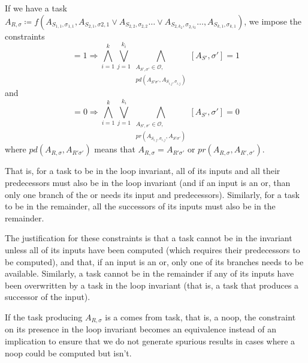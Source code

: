\documentclass[12pt,letterpaper]{article}
\newcommand*{\outputs}{\mathcal{O}}
\begin{document}
If we have a task $A_{R, \sigma} \coloneqq f(A_{S_{1, 1}, \sigma_{1, 1}}, A_{S_{2, 1}, \sigma{2, 1}} \vee A_{S_{2, 2}, \sigma_{2, 2}} \ldots \vee A_{S_{2, k_2}, \sigma_{2, i_2}} \ldots, A_{S_{k, 1}, \sigma_{k, 1}})$, we impose the constraints
\begin{equation*}
  [A_R, \sigma] = 1 \Rightarrow \bigwedge_{i = 1}^k \bigvee_{j = 1}^{k_i} \bigwedge_{\substack{A_{S', \sigma'} \in \outputs,\\
                                                    pd(A_{S' \sigma'}, A_{S_{i, j}, \sigma_{i, j}})}} [A_{S'}, \sigma'] = 1
\end{equation*}
and
\begin{equation*}
  [A_R, \sigma] = 0 \Rightarrow \bigwedge_{i = 1}^k \bigvee_{j = 1}^{k_i} \bigwedge_{\substack{A_{S', \sigma'} \in \outputs,\\
                                                    pr(A_{S_{i, j}, \sigma_{i, j}}, A_{S' \sigma'})}} [A_{S'}, \sigma'] = 0
\end{equation*}
where $pd(A_{R, \sigma}, A_{R' \sigma'})$ means that $A_{R, \sigma} = A_{R' \sigma'}$ or $pr(A_{R, \sigma}, A_{R', \sigma'})$.

That is, for a task to be in the loop invariant, all of its inputs and all their predecessors must also be in the loop invariant (and if an input is an or, than only one branch of the or needs its input and predecessors).
Similarly, for a task to be in the remainder, all the successors of its inputs must also be in the remainder.

The justification for these constraints is that a task cannot be in the invariant unless all of its inputs have been computed (which requires their predecessors to be computed), and that, if an input is an or, only one of its branches needs to be available.
Similarly, a task cannot be in the remainder if any of its inputs have been overwritten by a task in the loop invariant (that is, a task that produces a successor of the input).

If the task producing $A_{R, \sigma}$ is a comes from task, that is, a noop, the constraint on its presence in the loop invariant becomes an equivalence instead of an implication to ensure that we do not generate spurious results in cases where a noop could be computed but isn't.
\end{document}
